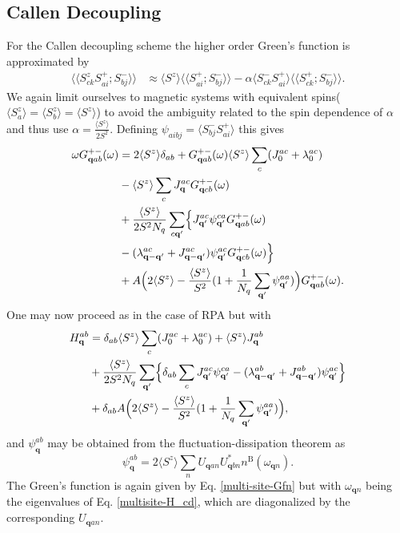 \documentclass[aps,prb,reprint,floatfix,superscriptaddress]{revtex4-2}
\begin{document}
\subsection{Callen Decoupling}
For the Callen decoupling scheme the higher order Green's function is approximated by
\begin{align}
    \langle \langle S_{ck}^z S_{ai}^+; S_{bj}^- \rangle \rangle &\approx \langle S^z \rangle \langle \langle S_{ai}^+; S_{bj}^- \rangle \rangle - \alpha \langle S_{ck}^- S_{ai}^+ \rangle \langle \langle S_{ck}^+; S_{bj}^- \rangle \rangle.
\end{align}
We again limit ourselves to magnetic systems with equivalent spins($\langle S_a^z \rangle = \langle S_b^z \rangle = \langle S^z \rangle$) to avoid the ambiguity related to the spin dependence of $\alpha$ and thus use $\alpha = \frac{\langle S^z \rangle}{2S^2}$. Defining $\psi_{aibj}=\langle S^-_{bj}S^+_{ai}\rangle$ this gives 
\begin{align}
    \omega G^{+-}_{\mathbf{q}ab}(\omega) &= 2 \langle S^z \rangle \delta_{ab} +  G^{+-}_{\mathbf{q}ab}(\omega)\langle S^z \rangle\sum_c   (J^{ac}_0 + \lambda^{ac}_0 )  \nonumber \\
    &-\langle S^z \rangle\sum_cJ^{ac}_\mathbf{q}G^{+-}_{\mathbf{q}cb}(\omega) \nonumber \\ 
    &+ \frac{\langle S^z \rangle}{2S^2N_q}\sum_{c\mathbf{q^\prime}} \Bigl\{ J^{ac}_\mathbf{q^\prime} \psi^{ca}_\mathbf{q^\prime} G^{+-}_{\mathbf{q}ab}(\omega)  \nonumber \\&- (\lambda^{ac}_\mathbf{q-q^\prime} + J^{ac}_\mathbf{q-q^\prime}) \psi^{ac}_\mathbf{q^\prime} G^{+-}_{\mathbf{q}cb}(\omega) \Bigr\}\nonumber \\&+ A\Bigl(2\langle S^z \rangle - \frac{\langle S^z \rangle}{S^2}( 1 + \frac{1}{N_q}\sum_\mathbf{q^\prime} \psi^{aa}_\mathbf{q^\prime} ) \Bigr)G^{+-}_{\mathbf{q}ab}(\omega). \label{twositeCD}
\end{align}
One may now proceed as in the case of RPA but with
\begin{align}\label{multisite-H_cd}
    H^{ab}_\mathbf{q} &= \delta_{ab} \langle S^z \rangle \sum_c(J^{ac}_0 + \lambda^{ac}_0 ) + \langle S^z \rangle J^{ab}_\mathbf{q}  \nonumber \\ &+ \frac{\langle S^z \rangle}{2S^2N_q}\sum_{\mathbf{q^\prime}} \Bigl\{ \delta_{ab} \sum_c J^{ac}_\mathbf{q^\prime} \psi^{ca}_\mathbf{q^\prime}  - (\lambda^{ab}_\mathbf{q-q^\prime} + J^{ab}_\mathbf{q-q^\prime}) \psi^{ac}_\mathbf{q^\prime} \Bigr\}\nonumber \\&+ \delta_{ab} A\Bigl(2\langle S^z \rangle - \frac{\langle S^z \rangle}{S^2}( 1 + \frac{1}{N_q}\sum_\mathbf{q^\prime} \psi^{aa}_\mathbf{q^\prime} ) \Bigr),
\end{align}
and $\psi^{ab}_\mathbf{q}$ may be obtained from the fluctuation-dissipation theorem as
\begin{equation}
 \psi^{ab}_\mathbf{q} = 2\langle S^z \rangle \sum_n U_{\mathbf{q}an}U^*_{\mathbf{q}bn} n^\mathrm{B}(\omega_{\mathbf{q}n}).
\end{equation}
The Green's function is again given by Eq. \eqref{multi-site-Gfn} but with $\omega_{\mathbf{q}n}$ being the eigenvalues of Eq. \eqref{multisite-H_cd}, which are diagonalized by the corresponding $U_{\mathbf{q}an}$.




\end{document}
